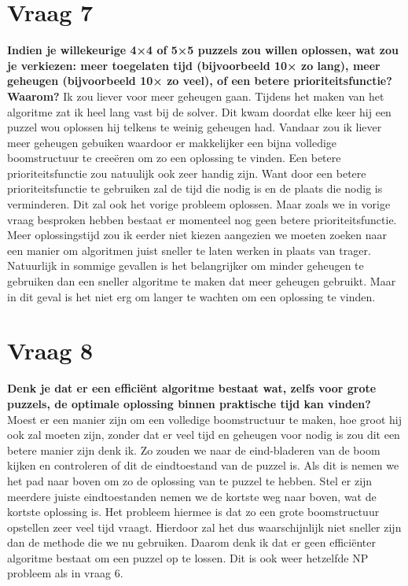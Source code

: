 \documentclass[12pt, letterpaper]{article}
\begin{document}
\section{Vraag 7}
\textbf{Indien je willekeurige 4×4 of 5×5 puzzels zou willen oplossen, wat zou je verkiezen: meer toegelaten tijd (bijvoorbeeld 10× zo lang), meer geheugen (bijvoorbeeld 10× zo veel), of een betere prioriteitsfunctie? Waarom?}\newline
Ik zou liever voor meer geheugen gaan. Tijdens het maken van het algoritme zat ik heel lang vast bij de solver. Dit kwam doordat
elke keer hij een puzzel wou oplossen hij telkens te weinig geheugen had. Vandaar zou ik liever meer geheugen gebuiken waardoor er makkelijker een bijna volledige boomstructuur
te creeëren om zo een oplossing te vinden.\newline
Een betere prioriteitsfunctie zou natuulijk ook zeer handig zijn. Want door een betere prioriteitsfunctie te gebruiken zal de tijd die nodig is en de plaats die nodig is verminderen.
Dit zal ook het vorige probleem oplossen. Maar zoals we in vorige vraag besproken hebben bestaat er momenteel nog geen betere prioriteitsfunctie.\newline
Meer oplossingstijd zou ik eerder niet kiezen aangezien we moeten zoeken naar een manier om algoritmen juist sneller te laten werken in plaats van trager. Natuurlijk in sommige 
gevallen is het belangrijker om minder geheugen te gebruiken dan een sneller algoritme te maken dat meer geheugen gebruikt. Maar in dit geval is het niet erg om langer te wachten om een oplossing te vinden. 

\section{Vraag 8}
\textbf{Denk je dat er een efficiënt algoritme bestaat wat, zelfs voor grote puzzels, de optimale oplossing binnen praktische tijd kan vinden?}\newline
Moest er een manier zijn om een volledige boomstructuur te maken, hoe groot hij ook zal moeten zijn, zonder dat er veel tijd en geheugen voor nodig is zou dit een betere
manier zijn denk ik. Zo zouden we naar de eind-bladeren van de boom kijken en controleren of dit de eindtoestand van de puzzel is. Als dit is nemen we het pad naar boven om zo
de oplossing van te puzzel te hebben. Stel er zijn meerdere juiste eindtoestanden nemen we de kortste weg naar boven, wat de kortste oplossing is. Het probleem hiermee is dat
zo een grote boomstructuur opstellen zeer veel tijd vraagt. Hierdoor zal het dus waarschijnlijk niet sneller zijn dan de methode die we nu gebruiken. Daarom denk ik dat er geen
efficiënter algoritme bestaat om een puzzel op te lossen. Dit is ook weer hetzelfde NP probleem als in vraag 6. 
\end{document}
